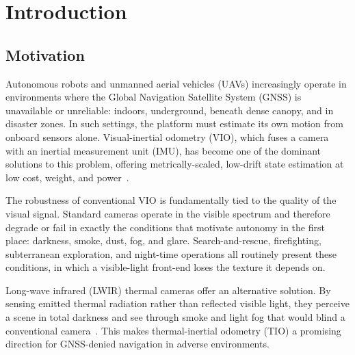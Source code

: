 \chapter{Introduction}
\label{ch:introduction}

\section{Motivation}
\label{sec:motivation}
Autonomous robots and unmanned aerial vehicles (UAVs) increasingly operate in environments where the Global Navigation Satellite System (GNSS) is unavailable or unreliable: indoors, underground, beneath dense canopy, and in disaster zones. In such settings, the platform must estimate its own motion from onboard sensors alone. Visual-inertial odometry (VIO), which fuses a camera with an inertial measurement unit (IMU), has become one of the dominant solutions to this problem, offering metrically-scaled, low-drift state estimation at low cost, weight, and power~\cite{Mourikis_2007, Qin_2018, Bloesch_2015, Campos_2021}.

The robustness of conventional VIO is fundamentally tied to the quality of the visual signal. Standard cameras operate in the visible spectrum and therefore degrade or fail in exactly the conditions that motivate autonomy in the first place: darkness, smoke, dust, fog, and glare. Search-and-rescue, firefighting, subterranean exploration, and night-time operations all routinely present these conditions, in which a visible-light front-end loses the texture it depends on.

Long-wave infrared (LWIR) thermal cameras offer an alternative solution. By sensing emitted thermal radiation rather than reflected visible light, they perceive a scene in total darkness and see through smoke and light fog that would blind a conventional camera~\cite{Gade_2014,Dhrafani_2025}. This makes thermal-inertial odometry (TIO) a promising direction for GNSS-denied navigation in adverse environments.

